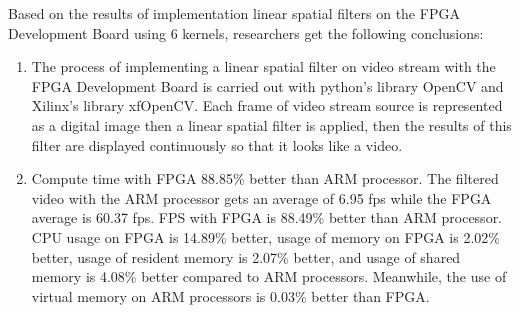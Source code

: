 Based on the results of implementation linear spatial filters on the FPGA Development Board using 6 kernels, researchers get the following conclusions:
\begin{enumerate}[topsep=0pt,itemsep=0pt,partopsep=0pt, parsep=0pt]

    \item The process of implementing a linear spatial filter on video stream with the FPGA Development Board is carried out with python's library OpenCV and Xilinx's library xfOpenCV. Each frame of video stream source is represented as a digital image then a linear spatial filter is applied, then the results of this filter are displayed continuously so that it looks like a video.


    \item Compute time with FPGA 88.85\% better than ARM processor. The filtered video with the ARM processor gets an average of 6.95 fps while the FPGA average is 60.37 fps. FPS with FPGA is 88.49\% better than ARM processor. CPU usage on FPGA is 14.89\% better, usage of memory on FPGA is 2.02\% better, usage of resident memory is 2.07\% better, and usage of shared memory is 4.08\% better compared to ARM processors. Meanwhile, the use of virtual memory on ARM processors is 0.03\% better than FPGA.
\end{enumerate}